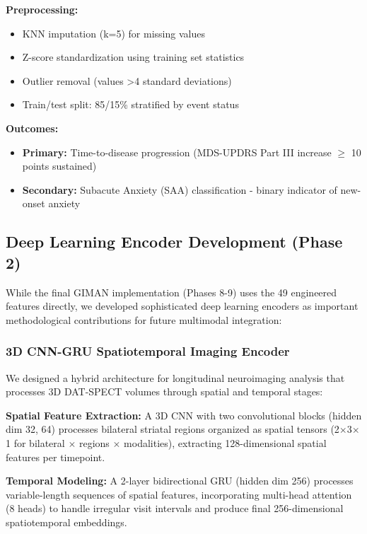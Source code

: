 \documentclass[conference]{IEEEtran}
\begin{document}
\textbf{Preprocessing:}
\begin{itemize}
\item KNN imputation (k=5) for missing values
\item Z-score standardization using training set statistics
\item Outlier removal (values \textgreater 4 standard deviations)
\item Train/test split: 85/15\% stratified by event status
\end{itemize}

\textbf{Outcomes:}
\begin{itemize}
\item \textbf{Primary:} Time-to-disease progression (MDS-UPDRS Part III increase $\geq$ 10 points sustained)
\item \textbf{Secondary:} Subacute Anxiety (SAA) classification - binary indicator of new-onset anxiety
\end{itemize}

\subsection{Deep Learning Encoder Development (Phase 2)}

While the final GIMAN implementation (Phases 8-9) uses the 49 engineered features directly, we developed sophisticated deep learning encoders as important methodological contributions for future multimodal integration:

\subsubsection{3D CNN-GRU Spatiotemporal Imaging Encoder}

We designed a hybrid architecture for longitudinal neuroimaging analysis that processes 3D DAT-SPECT volumes through spatial and temporal stages:

\textbf{Spatial Feature Extraction:} A 3D CNN with two convolutional blocks (hidden dim 32, 64) processes bilateral striatal regions organized as spatial tensors (2$\times$3$\times$1 for bilateral $\times$ regions $\times$ modalities), extracting 128-dimensional spatial features per timepoint.

\textbf{Temporal Modeling:} A 2-layer bidirectional GRU (hidden dim 256) processes variable-length sequences of spatial features, incorporating multi-head attention (8 heads) to handle irregular visit intervals and produce final 256-dimensional spatiotemporal embeddings.
\end{document}
